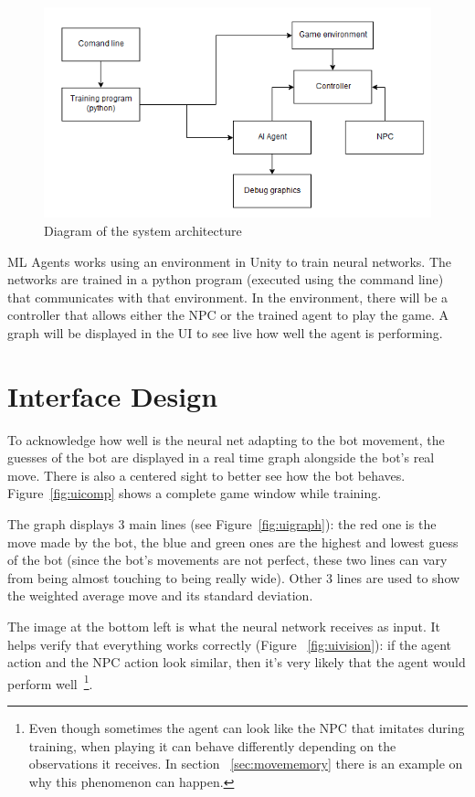\begin{figure}[h]
  \centering
		\includegraphics[width=.8\textwidth]{img/systemArchitecture.png}
  \caption{Diagram of the system architecture}
  \label{fig:architecture}
\end{figure}

ML Agents works using an environment in Unity to train neural networks. The networks are trained in a python program (executed using the command line) that communicates with that environment. In the environment, there will be a controller that allows either the NPC or the trained agent to play the game. A graph will be displayed in the UI to see live how well the agent is performing.

\section{Interface Design}

To acknowledge how well is the neural net adapting to the bot movement, the guesses of the bot are displayed in a real time graph alongside the bot's real move. There is also a centered sight to better see how the bot behaves. Figure~\ref{fig:uicomp} shows a complete game window while training.

The graph displays 3 main lines (see Figure~\ref{fig:uigraph}): the red one is the move made by the bot, the blue and green ones are the highest and lowest guess of the bot (since the bot's movements are not perfect, these two lines can vary from being almost touching to being really wide). Other 3 lines are used to show the weighted average move and its standard deviation.

\pagebreak

The image at the bottom left is what the neural network receives as input. It helps verify that everything works correctly (Figure ~\ref{fig:uivision}): if the agent action and the NPC action look similar, then it's very likely that the agent would perform well~\footnote{Even though sometimes the agent can look like the NPC that imitates during training, when playing it can behave differently depending on the observations it receives. In section ~\ref{sec:movememory} there is an example on why this phenomenon can happen. }.

